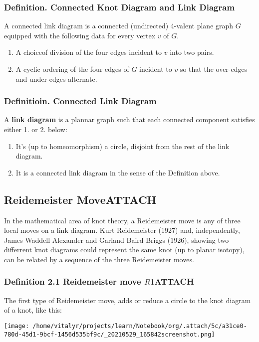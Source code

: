 \documentclass[a4paper]{article}
\begin{document}
\subsubsection{Definition. Connected Knot Diagram and Link Diagram}
\label{sec:orgee58db9}
A connected link diagram is a connected (undirected) 4-valent plane graph \(G\) equipped with the following data for every vertex \(v\) of \(G\).
\begin{enumerate}
\item A choiceof division of the four edges incident to \(v\) into two pairs.
\item A cyclic ordering of the four edges of \(G\) incident to \(v\) so that the over-edges and under-edges alternate.
\end{enumerate}

\subsubsection{Definitioin. Connected Link Diagram}
\label{sec:org3fd543e}
A \textbf{link diagram} is a plannar graph such that each connected component satisfies either 1. or 2. below:
\begin{enumerate}
\item It's (up to homeomorphism) a circle, disjoint from the rest of the link diagram.
\item It is a connected link diagram in the sense of the Definition above.
\end{enumerate}
\subsection{Reidemeister Move\hfill{}\textsc{ATTACH}}
\label{sec:orgc905e5b}
In the mathematical area of knot theory, a Reidemeister move is any of three local moves on a link diagram. Kurt Reidemeister (1927) and, independently, James Waddell Alexander and Garland Baird Briggs (1926), showing two differrent  knot diagrams could represent the same knot (up to planar isotopy), can be related by a sequence of the three Reidemeister moves.
\subsubsection{Definition 2.1 Reidemeister move \(R1\)\hfill{}\textsc{ATTACH}}
\label{sec:orgcbb1999}
The first type of Reidemeister move, adds or reduce a circle to the knot diagram of a knot, like this:

\begin{center}
\texttt{[image: /home/vitalyr/projects/learn/Notebook/org/.attach/5c/a31ce0-780d-45d1-9bcf-1456d535bf9c/\_20210529\_165842screenshot.png]}
\end{center}
\end{document}
